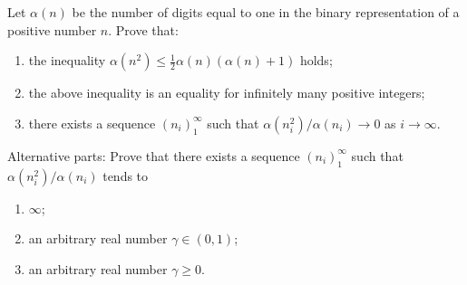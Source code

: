 Let $\alpha(n)$ be the number of digits equal to one in the binary representation of a positive number $n$. Prove that:
\begin{enumerate}
\item[(a)] the inequality $\alpha(n^2) \leq \frac{1}{2}\alpha(n)(\alpha(n)+1)$ holds;
\item[(b)] the above inequality is an equality for infinitely many positive integers;
\item[(c)] there exists a sequence $(n_i)_1^{\infty}$ such that $\alpha(n_i^2)/\alpha(n_i) \to 0$ as $i \to \infty$.
\end{enumerate}
Alternative parts: Prove that there exists a sequence $(n_i)_1^{\infty}$ such that $\alpha(n_i^2)/\alpha(n_i)$ tends to
\begin{enumerate}
\item[(d)] $\infty$;
\item[(e)] an arbitrary real number $\gamma \in (0,1)$;
\item[(f)] an arbitrary real number $\gamma \geq 0$.
\end{enumerate}
